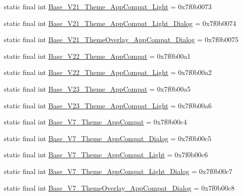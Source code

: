 \begin{CompactItemize}
\item 
static final int \hyperlink{classandroid_1_1support_1_1v7_1_1recyclerview_1_1_r_1_1style_959d9082e85a24d848e1504ddec94bc7}{Base\_\-V21\_\-Theme\_\-AppCompat\_\-Light} = 0x7f0b0073
\item 
static final int \hyperlink{classandroid_1_1support_1_1v7_1_1recyclerview_1_1_r_1_1style_fd8fbc175fdf4526d943d9fc9664a7a4}{Base\_\-V21\_\-Theme\_\-AppCompat\_\-Light\_\-Dialog} = 0x7f0b0074
\item 
static final int \hyperlink{classandroid_1_1support_1_1v7_1_1recyclerview_1_1_r_1_1style_f9b09a00ed2e34ff60fe5be0417a0327}{Base\_\-V21\_\-ThemeOverlay\_\-AppCompat\_\-Dialog} = 0x7f0b0075
\item 
static final int \hyperlink{classandroid_1_1support_1_1v7_1_1recyclerview_1_1_r_1_1style_244a76a35609c2b757261dea8b51ecc1}{Base\_\-V22\_\-Theme\_\-AppCompat} = 0x7f0b00a1
\item 
static final int \hyperlink{classandroid_1_1support_1_1v7_1_1recyclerview_1_1_r_1_1style_647fe87ed7e00f737c059333d884adda}{Base\_\-V22\_\-Theme\_\-AppCompat\_\-Light} = 0x7f0b00a2
\item 
static final int \hyperlink{classandroid_1_1support_1_1v7_1_1recyclerview_1_1_r_1_1style_9973a78b8de9de83c7f30e96ee2abfd6}{Base\_\-V23\_\-Theme\_\-AppCompat} = 0x7f0b00a5
\item 
static final int \hyperlink{classandroid_1_1support_1_1v7_1_1recyclerview_1_1_r_1_1style_79e134ab6b56884f8ea528f7c1ab6b39}{Base\_\-V23\_\-Theme\_\-AppCompat\_\-Light} = 0x7f0b00a6
\item 
static final int \hyperlink{classandroid_1_1support_1_1v7_1_1recyclerview_1_1_r_1_1style_ec532eb458281276d04163b2d891283c}{Base\_\-V7\_\-Theme\_\-AppCompat} = 0x7f0b00c4
\item 
static final int \hyperlink{classandroid_1_1support_1_1v7_1_1recyclerview_1_1_r_1_1style_79b8705b20a369c34afc9a0633e91f28}{Base\_\-V7\_\-Theme\_\-AppCompat\_\-Dialog} = 0x7f0b00c5
\item 
static final int \hyperlink{classandroid_1_1support_1_1v7_1_1recyclerview_1_1_r_1_1style_dcd3ea0985a64fc3b891d794db9c9c75}{Base\_\-V7\_\-Theme\_\-AppCompat\_\-Light} = 0x7f0b00c6
\item 
static final int \hyperlink{classandroid_1_1support_1_1v7_1_1recyclerview_1_1_r_1_1style_08ba05eb6ab479faf701e713caa48019}{Base\_\-V7\_\-Theme\_\-AppCompat\_\-Light\_\-Dialog} = 0x7f0b00c7
\item 
static final int \hyperlink{classandroid_1_1support_1_1v7_1_1recyclerview_1_1_r_1_1style_8dd57268e07d1d7fb864ee03a92b3d56}{Base\_\-V7\_\-ThemeOverlay\_\-AppCompat\_\-Dialog} = 0x7f0b00c8

\end{CompactItemize}
